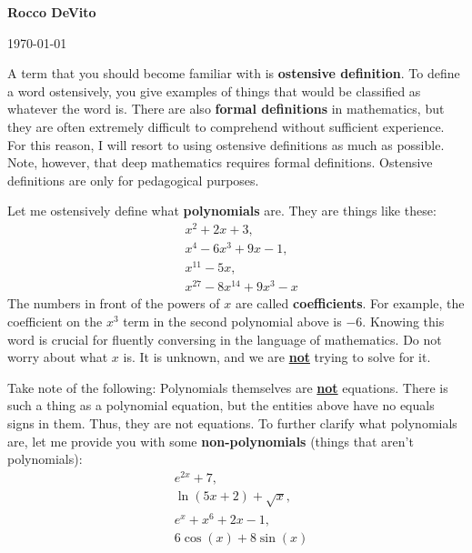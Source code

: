 \documentclass[12pt]{article}
\begin{document}

\hfill \textbf{Rocco DeVito}

\hfill \today

\vspace{2mm}


\vspace{8mm}

\noindent A term that you should become familiar with is \textbf{ostensive definition}. To define a word ostensively, you give examples of things that would be classified as whatever the word is. There are also \textbf{formal definitions} in mathematics, but they are often extremely difficult to comprehend without sufficient experience. For this reason, I will resort to using ostensive definitions as much as possible. Note, however, that deep mathematics requires formal definitions. Ostensive definitions are only for pedagogical purposes.

\vspace{5mm}

\noindent Let me ostensively define what \textbf{polynomials} are. They are things like these:
\begin{align*}
&x^2 + 2x + 3, \\
&x^4-6x^3+9x-1, \\
&x^{11}-5x, \\
&x^{27}-8x^{14}+9x^3-x
\end{align*}
\noindent The numbers in front of the powers of $x$ are called \textbf{coefficients}. For example, the coefficient on the $x^3$ term in the second polynomial above is $-6$. Knowing this word is crucial for fluently conversing in the language of mathematics. Do not worry about what $x$ is. It is unknown, and we are \underline{\textbf{not}} trying to solve for it.

\vspace{5mm}

\noindent Take note of the following: Polynomials themselves are \underline{\textbf{not}} equations. There is such a thing as a polynomial equation, but the entities above have no equals signs in them. Thus, they are not equations. To further clarify what polynomials are, let me provide you with some \textbf{non-polynomials} (things that aren't polynomials):
\begin{align*}
&e^{2x}+7, \\
&\ln(5x+2)+\sqrt{x},\\
&e^x + x^6+2x-1,\\
&6\cos(x)+ 8\sin(x)
\end{align*}
\end{document}
